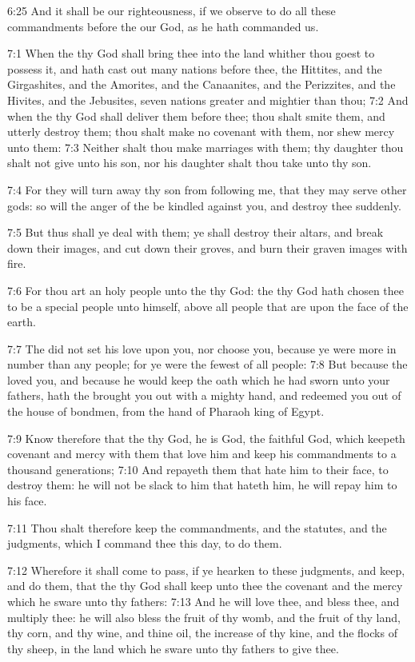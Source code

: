 6:25 And it shall be our righteousness, if we observe to do all these commandments before the \LORD our God, as he hath commanded us.

7:1 When the \LORD thy God shall bring thee into the land whither thou goest to possess it, and hath cast out many nations before thee, the Hittites, and the Girgashites, and the Amorites, and the Canaanites, and the Perizzites, and the Hivites, and the Jebusites, seven nations greater and mightier than thou; 7:2 And when the \LORD thy God shall deliver them before thee; thou shalt smite them, and utterly destroy them; thou shalt make no covenant with them, nor shew mercy unto them: 7:3 Neither shalt thou make marriages with them; thy daughter thou shalt not give unto his son, nor his daughter shalt thou take unto thy son.

7:4 For they will turn away thy son from following me, that they may serve other gods: so will the anger of the \LORD be kindled against you, and destroy thee suddenly.

7:5 But thus shall ye deal with them; ye shall destroy their altars, and break down their images, and cut down their groves, and burn their graven images with fire.

7:6 For thou art an holy people unto the \LORD thy God: the \LORD thy God hath chosen thee to be a special people unto himself, above all people that are upon the face of the earth.

7:7 The \LORD did not set his love upon you, nor choose you, because ye were more in number than any people; for ye were the fewest of all people: 7:8 But because the \LORD loved you, and because he would keep the oath which he had sworn unto your fathers, hath the \LORD brought you out with a mighty hand, and redeemed you out of the house of bondmen, from the hand of Pharaoh king of Egypt.

7:9 Know therefore that the \LORD thy God, he is God, the faithful God, which keepeth covenant and mercy with them that love him and keep his commandments to a thousand generations; 7:10 And repayeth them that hate him to their face, to destroy them: he will not be slack to him that hateth him, he will repay him to his face.

7:11 Thou shalt therefore keep the commandments, and the statutes, and the judgments, which I command thee this day, to do them.

7:12 Wherefore it shall come to pass, if ye hearken to these judgments, and keep, and do them, that the \LORD thy God shall keep unto thee the covenant and the mercy which he sware unto thy fathers: 7:13 And he will love thee, and bless thee, and multiply thee: he will also bless the fruit of thy womb, and the fruit of thy land, thy corn, and thy wine, and thine oil, the increase of thy kine, and the flocks of thy sheep, in the land which he sware unto thy fathers to give thee.

